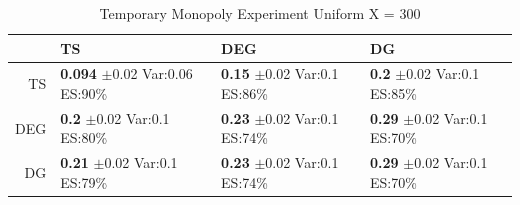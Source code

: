 \documentclass[11pt,letterpaper]{article}
\begin{document}
\begin{table}[H]
\centering
\caption{Temporary Monopoly Experiment Uniform X = 300} 
\begin{tabular}{rlll}
  \hline
 & TS & DEG &  DG \\ 
  \hline
TS & \makecell{\textbf{0.094} $\pm$0.02\\Var:0.06\\ES:90\%} & \makecell{\textbf{0.15} $\pm$0.02\\Var:0.1\\ES:86\%} & \makecell{\textbf{0.2} $\pm$0.02\\Var:0.1\\ES:85\%} \\ 
  DEG & \makecell{\textbf{0.2} $\pm$0.02\\Var:0.1\\ES:80\%} & \makecell{\textbf{0.23} $\pm$0.02\\Var:0.1\\ES:74\%} & \makecell{\textbf{0.29} $\pm$0.02\\Var:0.1\\ES:70\%} \\ 
   DG & \makecell{\textbf{0.21} $\pm$0.02\\Var:0.1\\ES:79\%} & \makecell{\textbf{0.23} $\pm$0.02\\Var:0.1\\ES:74\%} & \makecell{\textbf{0.29} $\pm$0.02\\Var:0.1\\ES:70\%} \\ 
   \hline
\end{tabular}
\end{table}
\end{document}
